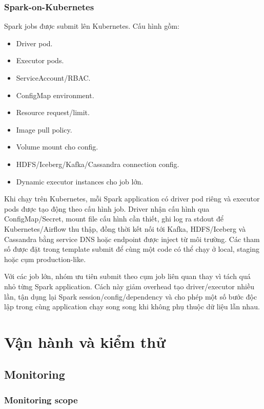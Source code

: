 \documentclass[12pt,a4paper]{article}
\newcommand{\tightlist}{\setlength{\itemsep}{0pt}\setlength{\parskip}{0pt}}
\begin{document}
\subsubsection{Spark-on-Kubernetes}\label{spark-on-kubernetes}

Spark jobs được submit lên Kubernetes. Cấu hình gồm:

\begin{itemize}
\tightlist
\item
  Driver pod.
\item
  Executor pods.
\item
  ServiceAccount/RBAC.
\item
  ConfigMap environment.
\item
  Resource request/limit.
\item
  Image pull policy.
\item
  Volume mount cho config.
\item
  HDFS/Iceberg/Kafka/Cassandra connection config.
\item
  Dynamic executor instances cho job lớn.
\end{itemize}

Khi chạy trên Kubernetes, mỗi Spark application có driver pod riêng và executor pods được tạo động theo cấu hình job. Driver nhận cấu hình qua ConfigMap/Secret, mount file cấu hình cần thiết, ghi log ra stdout để Kubernetes/Airflow thu thập, đồng thời kết nối tới Kafka, HDFS/Iceberg và Cassandra bằng service DNS hoặc endpoint được inject từ môi trường. Các tham số được đặt trong template submit để cùng một code có thể chạy ở local, staging hoặc cụm production-like.

Với các job lớn, nhóm ưu tiên submit theo cụm job liên quan thay vì tách quá nhỏ từng Spark application. Cách này giảm overhead tạo driver/executor nhiều lần, tận dụng lại Spark session/config/dependency và cho phép một số bước độc lập trong cùng application chạy song song khi không phụ thuộc dữ liệu lẫn nhau.

\newpage
\section{Vận hành và kiểm thử}\label{vux1eadn-huxe0nh-vuxe0-kiux1ec3m-thux1eed}

\subsection{Monitoring}\label{monitoring}

\subsubsection{Monitoring scope}\label{monitoring-scope}
\end{document}
